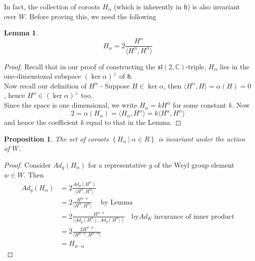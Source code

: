 \documentclass[11pt]{article}
\newtheorem{lemma}[theorem]{Lemma}
\newtheorem{proposition}[theorem]{Proposition}
\newcommand{\bb}[1]{\mathbb{#1}}
\newcommand{\mf}[1]{\mathfrak{#1}}
\begin{document}
In fact, the collection of coroots $H_{\alpha}$ (which is inherently in $\mf{h}$) is also invariant over $W$. Before proving this, we need the following
\begin{lemma} \label{halpha}
$$H_{\alpha} = 2\frac{H^{\alpha}}{\langle H^{\alpha}, H^{\alpha} \rangle}$$
\end{lemma}
\begin{proof}
Recall that in our proof of constructing the $\mf{sl}(2,\bb{C})$-triple, $H_{\alpha}$ lies in the one-dimensional subspace $(\ker \alpha)^{\perp}$ of $\mf{h}$.\\
Now recall our definition of $H^{\alpha}$ - Suppose $H \in \ker \alpha$, then $\langle H^{\alpha}, H \rangle = \alpha(H) = 0$, hence $H^{\alpha} \in (\ker \alpha)^{\perp}$ too.\\
Since the space is one dimensional, we write $H_{\alpha} = kH^{\alpha}$ for some constant $k$. Now
$$2 = \alpha(H_{\alpha}) = \langle H_{\alpha}, H^{\alpha} \rangle = k \langle H^{\alpha}, H^{\alpha} \rangle$$
and hence the coefficient $k$ equal to that in the Lemma.
\end{proof}

\begin{proposition}
The set of coroots $\left\{ H_{\alpha}\ \Big|\ \alpha \in R\right\}$ is invariant under the action of $W$.\\
\end{proposition}
\begin{proof}
Consider $Ad_g(H_{\alpha})$ for a representative $g$ of the Weyl group element $w \in W$. Then
\begin{align*}
Ad_g(H_{\alpha}) &= 2 \frac{Ad_g(H^{\alpha})}{\langle H^{\alpha}, H^{\alpha} \rangle}\\
&= 2\frac{H^{w\cdot \alpha}}{\langle H^{\alpha}, H^{\alpha} \rangle} \ \ \ \ \text{      by Lemma}\\
&= 2\frac{H^{w\cdot \alpha}}{\langle Ad_g(H^{\alpha}), Ad_g(H^{\alpha} \rangle)} \ \ \ \ \text{by}Ad_K \text{ invarance of inner product}\\
&= 2\frac{2H^{w\cdot \alpha}}{\langle H^{w\cdot \alpha}, H^{w \cdot \alpha} \rangle}\\
&= H_{w \cdot \alpha}
\end{align*}
\end{proof}
\end{document}
